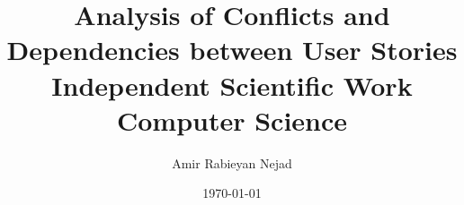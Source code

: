 \documentclass[11pt,a4paper]{article}
\title{Analysis of Conflicts and Dependencies between User Stories\\[0.5em] \large{Independent Scientific Work Computer Science \\[0.5em]} }
\author{Amir Rabieyan Nejad}
\date{\today}
\numberwithin{equation}{section}
\begin{document}
\maketitle
\begin{abstract}

\end{abstract}
\newpage
\tableofcontents
\newpage




%







\newpage




   
\end{document}
